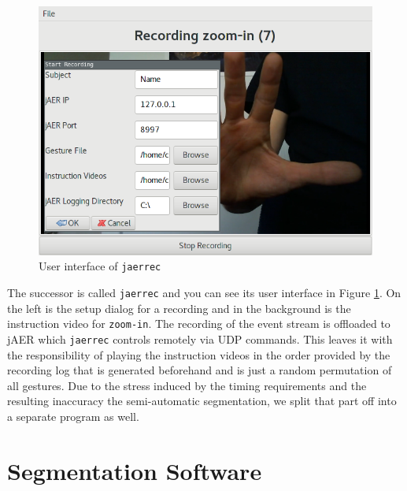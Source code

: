 \begin{figure}[h]
  \centering
  \includegraphics{figures/dataset/jaerrec}
  \caption{User interface of \texttt{jaerrec}}
  \label{fig:jaerrec}
\end{figure}

The successor is called \texttt{jaerrec} and you can see its user interface in
Figure \ref{fig:jaerrec}. On the left is the setup dialog for a recording and in
the background is the instruction video for \texttt{zoom-in}. The recording of
the event stream is offloaded to jAER which \texttt{jaerrec} controls remotely
via UDP commands. This leaves it with the responsibility of playing the
instruction videos in the order provided by the recording log that is generated
beforehand and is just a random permutation of all gestures. Due to the stress
induced by the timing requirements and the resulting inaccuracy the
semi-automatic segmentation, we split that part off into a separate program as
well.

\section{Segmentation Software}
\label{sec:segmentation}

